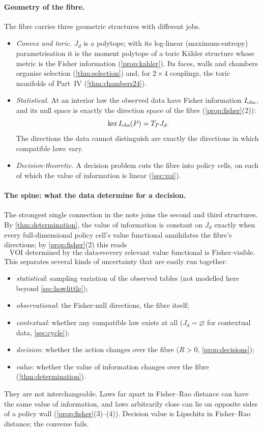 \documentclass[11pt]{article}
\theoremstyle{definition}\newtheorem{definition}[theorem]{Definition}\newtheorem{remark}[theorem]{Remark}\newtheorem{example}[theorem]{Example}\newtheorem{problem}[theorem]{Open problem}\crefname{problem}{Problem}{Problems}
\begin{document}
\paragraph{Geometry of the fibre.} The fibre carries three geometric structures with different jobs.
\begin{itemize}
\item \emph{Convex and toric.} $J_d$ is a polytope; with its log-linear (maximum-entropy) parametrisation it is the moment polytope of a toric K\"ahler structure whose metric is the Fisher information (\cref{prop:kahler}). Its faces, walls and chambers organise selection (\cref{thm:selection}) and, for $2\times4$ couplings, the toric manifolds of Part~IV (\cref{thm:chambers24}).
\item \emph{Statistical.} At an interior law the observed data have Fisher information $I_{\rm obs}$, and its null space is exactly the direction space of the fibre (\cref{prop:fisher}(2)):
\[
\ker I_{\rm obs}(P)=T_PJ_d .
\]
The directions the data cannot distinguish are exactly the directions in which compatible laws vary.
\item \emph{Decision-theoretic.} A decision problem cuts the fibre into policy cells, on each of which the value of information is linear (\cref{sec:voi}).
\end{itemize}

\paragraph{The spine: what the data determine for a decision.} The strongest single connection in the note joins the second and third structures. By \cref{thm:determination}, the value of information is constant on $J_d$ exactly when every full-dimensional policy cell's value functional annihilates the fibre's directions; by \cref{prop:fisher}(2) this reads
\[
\text{VOI determined by the data}\iff\text{every relevant value functional is Fisher-visible.}
\]
This separates several kinds of uncertainty that are easily run together:
\begin{itemize}
\item \emph{statistical}: sampling variation of the observed tables (not modelled here beyond \cref{sec:howlittle});
\item \emph{observational}: the Fisher-null directions, the fibre itself;
\item \emph{contextual}: whether any compatible law exists at all ($J_d=\varnothing$ for contextual data, \cref{sec:cycle});
\item \emph{decision}: whether the action changes over the fibre ($R>0$, \cref{prop:decisions});
\item \emph{value}: whether the value of information changes over the fibre (\cref{thm:determination}).
\end{itemize}
They are not interchangeable. Laws far apart in Fisher--Rao distance can have the same value of information, and laws arbitrarily close can lie on opposite sides of a policy wall (\cref{prop:fisher}(3)--(4)). Decision value is Lipschitz in Fisher--Rao distance; the converse fails.
\end{document}
